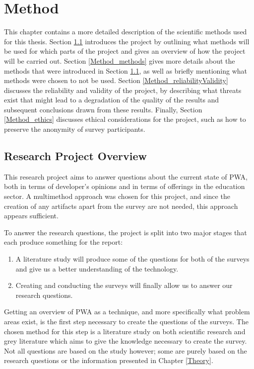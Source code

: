 \documentclass[a4paper,12pt]{article}
\begin{document}
\section{Method}
\label{Method}
This chapter contains a more detailed description of the scientific methods used for this thesis. Section \ref{Method_project} introduces the project by outlining what methods will be used for which parts of the project and gives an overview of how the project will be carried out. Section \ref{Method_methods} gives more details about the methods that were introduced in Section \ref{Method_project}, as well as briefly mentioning what methods were chosen to not be used. Section \ref{Method_reliabilityValidity} discusses the reliability and validity of the project, by describing what threats exist that might lead to a degradation of the quality of the results and subsequent conclusions drawn from these results. Finally, Section \ref{Method_ethics} discusses ethical considerations for the project, such as how to preserve the anonymity of survey participants.

\subsection{Research Project Overview}
\label{Method_project}
This research project aims to answer questions about the current state of PWA, both in terms of developer’s opinions and in terms of offerings in the education sector. A multimethod approach was chosen for this project, and since the creation of any artifacts apart from the survey are not needed, this approach appears sufficient.

To answer the research questions, the project is split into two major stages that each produce something for the report:

\begin{enumerate}
    \item A literature study will produce some of the questions for both of the surveys and give us a better understanding of the technology.
    \item Creating and conducting the surveys will finally allow us to answer our research questions.
\end{enumerate}

Getting an overview of PWA as a technique, and more specifically what problem areas exist, is the first step necessary to create the questions of the surveys. The chosen method for this step is a literature study on both scientific research and grey literature which aims to give the knowledge necessary to create the survey. Not all questions are based on the study however; some are purely based on the research questions or the information presented in Chapter \ref{Theory}.
\end{document}

